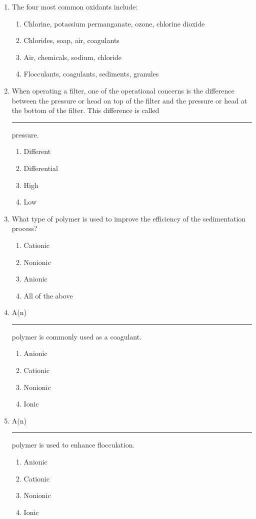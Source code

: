 \documentclass[10pt]{article}
\begin{document}
\begin{enumerate}
\begin{enumerate}
\item The four most common oxidants include:
\begin{enumerate}
\item Chlorine, potassium permanganate, ozone, chlorine dioxide
\item Chlorides, soap, air, coagulants
\item Air, chemicals, sodium, chloride
\item Flocculants, coagulants, sediments, granules
\end{enumerate}

\item  When operating a filter, one of the operational concerns is the difference between the pressure or head on top of the filter and the pressure or head at the bottom of the filter. This difference is called \rule{2cm}{0.3pt} pressure.
\begin{enumerate}
\item Different
\item Differential
\item High
\item Low
\end{enumerate}

\item  What type of polymer is used to improve the efficiency of the sedimentation
process?
\begin{enumerate}
\item Cationic
\item Nonionic
\item Anionic
\item All of the above
\end{enumerate}

\item A(n) \rule{2cm}{0.3pt} polymer is commonly used as a coagulant.
\begin{enumerate}
\item Anionic
\item Cationic
\item Nonionic
\item Ionic
\end{enumerate}


\item A(n) \rule{2cm}{0.3pt} polymer is used to enhance flocculation.
\begin{enumerate}
\item Anionic
\item Cationic
\item Nonionic
\item Ionic
\end{enumerate}


\end{enumerate}
\end{enumerate}
\end{document}
